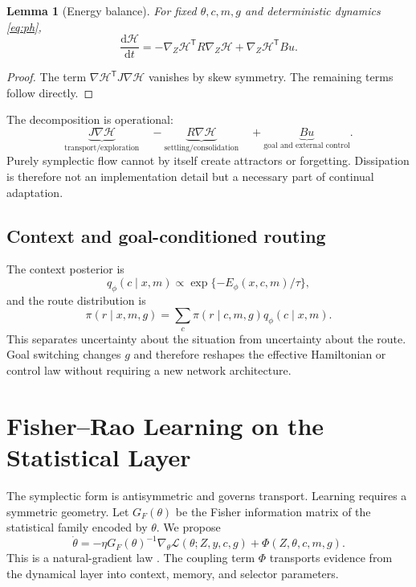 \documentclass[11pt]{article}
\newtheorem{lemma}{Lemma}
\theoremstyle{definition}\newtheorem{definition}{Definition}\newtheorem{assumption}{Assumption}
\theoremstyle{remark}\newtheorem{remark}{Remark}
\newcommand{\dd}{\mathrm{d}}\newcommand{\T}{^{\mathsf T}}
\begin{document}
\begin{lemma}[Energy balance]
For fixed $\theta,c,m,g$ and deterministic dynamics \eqref{eq:ph},
\begin{equation}
\frac{\dd\mathcal H}{\dd t}=-\nabla_Z\mathcal H\T R\nabla_Z\mathcal H+\nabla_Z\mathcal H\T Bu.
\end{equation}
\end{lemma}
\begin{proof}
The term $\nabla\mathcal H\T J\nabla\mathcal H$ vanishes by skew symmetry. The remaining terms follow directly.
\end{proof}

The decomposition is operational:
\begin{equation}
\underbrace{J\nabla\mathcal H}_{\text{transport/exploration}}
\quad-
\underbrace{R\nabla\mathcal H}_{\text{settling/consolidation}}
\quad+
\underbrace{Bu}_{\text{goal and external control}}.
\end{equation}
Purely symplectic flow cannot by itself create attractors or forgetting. Dissipation is therefore not an implementation detail but a necessary part of continual adaptation.

\subsection{Context and goal-conditioned routing}
The context posterior is
\begin{equation}
q_\phi(c\mid x,m)\propto \exp\{-E_\phi(x,c,m)/\tau\},
\end{equation}
and the route distribution is
\begin{equation}
\pi(r\mid x,m,g)=\sum_c \pi(r\mid c,m,g)q_\phi(c\mid x,m).
\end{equation}
This separates uncertainty about the situation from uncertainty about the route. Goal switching changes $g$ and therefore reshapes the effective Hamiltonian or control law without requiring a new network architecture.

\section{Fisher--Rao Learning on the Statistical Layer}
The symplectic form is antisymmetric and governs transport. Learning requires a symmetric geometry. Let $G_F(\theta)$ be the Fisher information matrix of the statistical family encoded by $\theta$. We propose
\begin{equation}
\dot\theta=-\eta G_F(\theta)^{-1}\nabla_\theta\mathcal L(\theta;Z,y,c,g)+\Phi(Z,\theta,c,m,g).
\label{eq:natgrad}
\end{equation}
This is a natural-gradient law \cite{Rao1945,Amari1998,AmariNagaoka2000,Ollivier2015}. The coupling term $\Phi$ transports evidence from the dynamical layer into context, memory, and selector parameters.
\end{document}
